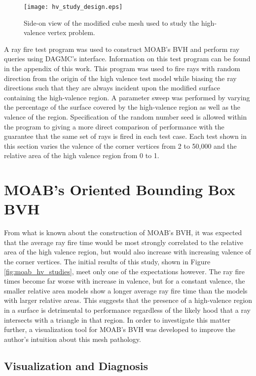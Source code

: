 \begin{figure}[H]
  \centering
    \texttt{[image: hv\_study\_design.eps]}
    \caption{Side-on view of the modified cube mesh used to study the
      high-valence vertex problem.}
    \label{fig:hv_cube_design}
\end{figure}

A ray fire test program was used to construct MOAB's BVH and perform ray queries
using DAGMC's interface. Information on this test program can be found in the
appendix of this work. This program was used to fire rays with random direction
from the origin of the high valence test model while biasing the ray directions
such that they are always incident upon the modified surface containing the
high-valence region. A parameter sweep was performed by varying the percentage
of the surface covered by the high-valence region as well as the valence of the
region. Specification of the random number seed is allowed within the program to
giving a more direct comparison of performance with the guarantee that the same
set of rays is fired in each test case. Each test shown in this section varies
the valence of the corner vertices from 2 to 50,000 and the relative area of the
high valence region from 0 to 1.

\section{MOAB's Oriented Bounding Box BVH}\label{sec:hv_study_MOAB}

From what is known about the construction of MOAB's BVH, it was expected that
the average ray fire time would be most strongly correlated to the relative area
of the high valence region, but would also increase with increasing valence of
the corner vertices. The initial results of this study, shown in Figure
\ref{fig:moab_hv_studies}, meet only one of the expectations however. The ray fire
times become far worse with increase in valence, but for a constant valence, the
smaller relative area models show a longer average ray fire time than the models
with larger relative areas. This suggests that the presence of a high-valence
region in a surface is detrimental to performance regardless of the likely hood
that a ray intersects with a triangle in that region. In order to investigate
this matter further, a visualization tool for MOAB's BVH was developed to
improve the author's intuition about this mesh pathology.

\subsection{Visualization and Diagnosis}\label{subsec:hv_vis}

